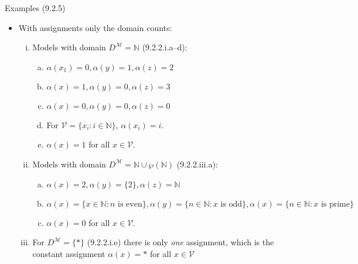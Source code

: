 \begin{frame}{Examples (9.2.5)}

\begin{itemize}

	\item With assignments only the domain counts:
	
	\begin{enumerate}[(i)]
		
			\item Models with domain $D^\mathcal{M}=\mathbb{N}$ (9.2.2.i.a--d):
			
				\begin{enumerate}[(a)]
				
					\item $\alpha(x_1)=0, \alpha(y)=1, \alpha(z)=2$
					
					\item $\alpha(x)=1, \alpha(y)=0, \alpha(z)=3$
					
					\item $\alpha(x)=0, \alpha(y)=0, \alpha(z)=0$
					
					\item For $\mathcal{V}=\{x_i:i\in\mathbb{N}\}$, $\alpha(x_i)=i$.
					\item $\alpha(x)=1$ for all $x\in\mathcal{V}$.
									
				\end{enumerate}
				
			\item Models with domain $D^\mathcal{M}=\mathbb{N}\cup\wp(\mathbb{N})$ (9.2.2.iii.a):

					\begin{enumerate}[(a)]

						\item $\alpha(x)=2, \alpha(y)=\{2\}, \alpha(z)=\mathbb{N}$
						
						\item $\alpha(x)=\{x\in\mathbb{N}:n\text{ is even}\}, \alpha(y)=\{n\in\mathbb{N}:x\text{ is odd}\}, \alpha(x)=\{n\in\mathbb{N}:x\text{ is prime}\}$
						
						\item $\alpha(x)=0$ for all $x\in\mathcal{V}$.

						\end{enumerate}

			\item For $D^\mathcal{M}=\{\ast\}$ (9.2.2.i.e) there is only \emph{one} assignment, which is the constant assignment $\alpha(x)=\ast$ for all $x\in\mathcal{V}$

		\end{enumerate}

\end{itemize}

\end{frame}

